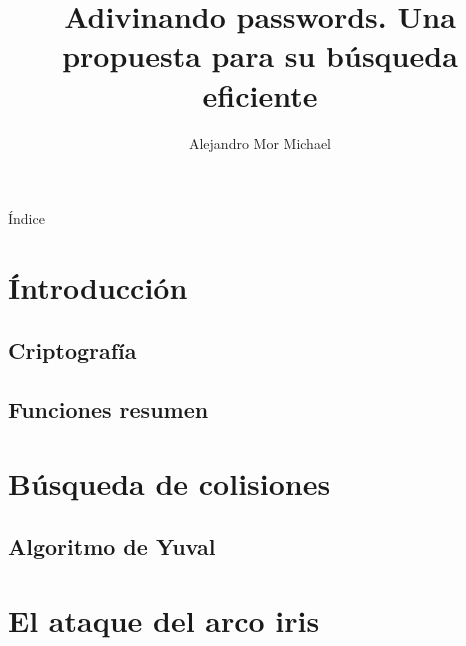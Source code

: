 \documentclass{beamer}
\title{Adivinando passwords. Una propuesta para su búsqueda eficiente}
\author{Alejandro Mor Michael}
\date[]{}
\begin{document}
\maketitle

\begin{frame}{Índice}
	\tableofcontents
\end{frame}

\section{Íntroducción}

\begin{frame}

\end{frame}

\subsection{Criptografía}

\begin{frame}
	\cite{handbook}
\end{frame}

\subsection{Funciones resumen}

\begin{frame}

\end{frame}

\section{Búsqueda de colisiones}

\begin{frame}
	\cite{hellman, rivest}
\end{frame}

\subsection{Algoritmo de Yuval}

\begin{frame}
	\cite{birthday, knapsack, logarithm}
	\cite{DES}
\end{frame}

\section{El ataque del arco iris}
\end{document}
